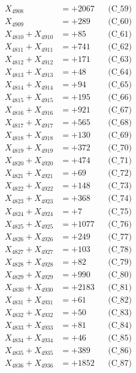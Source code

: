 \documentclass[a4paper,10pt]{article}
\begin{document}
{\begin{align}
X_{4908} &= +2067 && \text{(C\_59)} \\
X_{4909} &= +289 && \text{(C\_60)} \\
\allowbreak
X_{4810} + X_{4910} &= +85 && \text{(C\_61)} \\
X_{4811} + X_{4911} &= +741 && \text{(C\_62)} \\
X_{4812} + X_{4912} &= +171 && \text{(C\_63)} \\
X_{4813} + X_{4913} &= +48 && \text{(C\_64)} \\
X_{4814} + X_{4914} &= +94 && \text{(C\_65)} \\
\allowbreak
X_{4815} + X_{4915} &= +195 && \text{(C\_66)} \\
X_{4816} + X_{4916} &= +921 && \text{(C\_67)} \\
X_{4817} + X_{4917} &= +565 && \text{(C\_68)} \\
X_{4818} + X_{4918} &= +130 && \text{(C\_69)} \\
X_{4819} + X_{4919} &= +372 && \text{(C\_70)} \\
\allowbreak
X_{4820} + X_{4920} &= +474 && \text{(C\_71)} \\
X_{4821} + X_{4921} &= +69 && \text{(C\_72)} \\
X_{4822} + X_{4922} &= +148 && \text{(C\_73)} \\
X_{4823} + X_{4923} &= +368 && \text{(C\_74)} \\
X_{4824} + X_{4924} &= +7 && \text{(C\_75)} \\
\allowbreak
X_{4825} + X_{4925} &= +1077 && \text{(C\_76)} \\
X_{4826} + X_{4926} &= +249 && \text{(C\_77)} \\
X_{4827} + X_{4927} &= +103 && \text{(C\_78)} \\
X_{4828} + X_{4928} &= +82 && \text{(C\_79)} \\
X_{4829} + X_{4929} &= +990 && \text{(C\_80)} \\
\allowbreak
X_{4830} + X_{4930} &= +2183 && \text{(C\_81)} \\
X_{4831} + X_{4931} &= +61 && \text{(C\_82)} \\
X_{4832} + X_{4932} &= +50 && \text{(C\_83)} \\
X_{4833} + X_{4933} &= +81 && \text{(C\_84)} \\
X_{4834} + X_{4934} &= +46 && \text{(C\_85)} \\
\allowbreak
X_{4835} + X_{4935} &= +389 && \text{(C\_86)} \\
X_{4836} + X_{4936} &= +1852 && \text{(C\_87)} \\

\end{align}}
\end{document}
